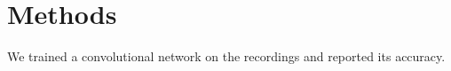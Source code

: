 \documentclass{article}
\begin{document}
\section{Methods}
We trained a convolutional network on the recordings and reported its accuracy.
\end{document}
